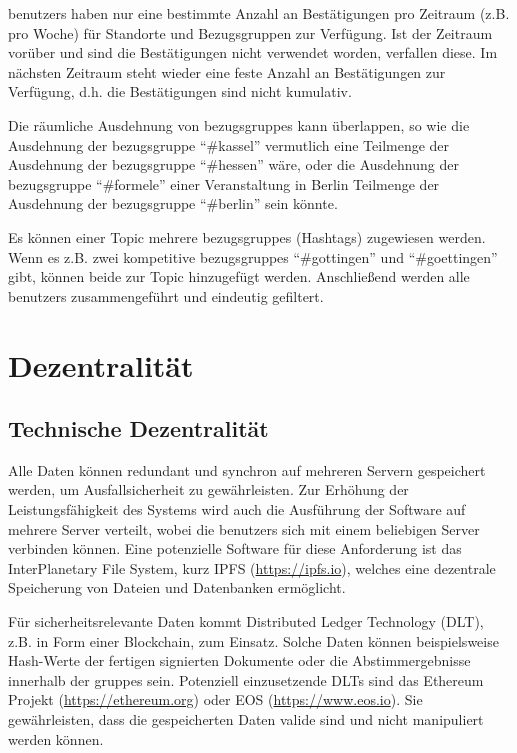 \documentclass[10pt]{article}
\begin{document}
\glspl{benutzer} haben nur eine bestimmte Anzahl an Bestätigungen pro Zeitraum (z.B. pro Woche) für Standorte und Bezugsgruppen zur Verfügung. Ist der Zeitraum vorüber und sind die Bestätigungen nicht verwendet worden, verfallen diese. Im nächsten Zeitraum steht wieder eine feste Anzahl an Bestätigungen zur Verfügung, d.h. die Bestätigungen sind nicht kumulativ.

Die räumliche Ausdehnung von \glspl{bezugsgruppe} kann überlappen, so wie die Ausdehnung der \gls{bezugsgruppe} ``\#kassel'' vermutlich eine Teilmenge der Ausdehnung der \gls{bezugsgruppe} ``\#hessen'' wäre, oder die Ausdehnung der \gls{bezugsgruppe} ``\#formele'' einer Veranstaltung in Berlin Teilmenge der Ausdehnung der \gls{bezugsgruppe} ``\#berlin'' sein könnte.

Es können einer Topic mehrere \glspl{bezugsgruppe} (Hashtags) zugewiesen werden. Wenn es z.B. zwei kompetitive \glspl{bezugsgruppe} ``\#gottingen'' und ``\#goettingen'' gibt, können beide zur Topic hinzugefügt werden. Anschließend werden alle \glspl{benutzer} zusammengeführt und eindeutig gefiltert.


\section{Dezentralität}

\subsection{Technische Dezentralität}

Alle Daten können redundant und synchron auf mehreren Servern gespeichert werden, um Ausfallsicherheit zu gewährleisten. Zur Erhöhung der Leistungsfähigkeit des Systems wird auch die Ausführung der Software auf mehrere Server verteilt, wobei die \glspl{benutzer} sich mit einem beliebigen Server verbinden können. Eine potenzielle Software für diese Anforderung ist das InterPlanetary File System, kurz IPFS (\href{https://ipfs.io}{https://ipfs.io}), welches eine dezentrale Speicherung von Dateien und Datenbanken ermöglicht.

Für sicherheitsrelevante Daten kommt Distributed Ledger Technology (DLT), z.B. in Form einer Blockchain, zum Einsatz. Solche Daten können beispielsweise Hash-Werte der fertigen signierten Dokumente oder die Abstimmergebnisse innerhalb der \glspl{gruppe} sein. Potenziell einzusetzende DLTs sind das Ethereum Projekt (\href{https://ethereum.org}{https://ethereum.org}) oder EOS (\href{https://www.eos.io}{https://www.eos.io}). Sie gewährleisten, dass die gespeicherten Daten valide sind und nicht manipuliert werden können.
\end{document}
